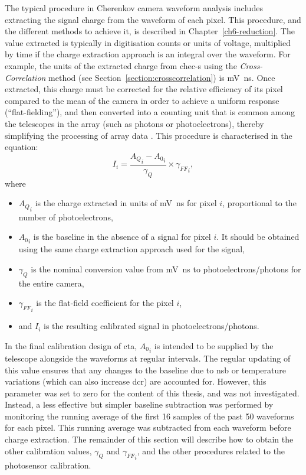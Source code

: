 The typical procedure in Cherenkov camera waveform analysis includes extracting the signal charge from the waveform of each pixel. This procedure, and the different methods to achieve it, is described in Chapter~\ref{ch6-reduction}. The value extracted is typically in digitisation counts or units of voltage, multiplied by time if the charge extraction approach is an integral over the waveform. For example, the units of the extracted charge from \gls{chec-s} using the \textit{Cross-Correlation} method (see Section~\ref{section:crosscorrelation}) is \si{mV ns}. Once extracted, this charge must be corrected for the relative efficiency of its pixel compared to the mean of the camera in order to achieve a uniform response (``flat-fielding''), and then converted into a counting unit that is common among the telescopes in the array (such as photons or photoelectrons), thereby simplifying the processing of array data \cite{Aharonian2004}. This procedure is characterised in the equation: 
\begin{equation} \label{eq:photosensor_calibration}
I_i = \frac{{A_Q}_i - {A_0}_i}{\gamma_{Q}} \times {\gamma_{FF}}_i,
\end{equation}
where 
\begin{itemize}
\item ${A_Q}_i$ is the charge extracted in units of \si{mV ns} for pixel $i$, proportional to the number of photoelectrons,
\item ${A_0}_i$ is the baseline in the absence of a signal for pixel $i$. It should be obtained using the same charge extraction approach used for the signal,
\item $\gamma_{Q}$ is the nominal conversion value from \si{mV ns} to photoelectrons/photons for the entire camera,
\item ${\gamma_{FF}}_i$ is the flat-field coefficient for the pixel $i$,
\item and $I_i$ is the resulting calibrated signal in photoelectrons/photons.
\end{itemize}

In the final calibration design of \gls{cta}, ${A_0}_i$ is intended to be supplied by the telescope alongside the waveforms at regular intervals. The regular updating of this value ensures that any changes to the baseline due to \gls{nsb} or temperature variations (which can also increase \gls{dcr}) are accounted for. However, this parameter was set to zero for the content of this thesis, and was not investigated. Instead, a less effective but simpler baseline subtraction was performed by monitoring the running average of the first 16 samples of the past 50 waveforms for each pixel. This running average was subtracted from each waveform before charge extraction. The remainder of this section will describe how to obtain the other calibration values, $\gamma_{Q}$ and ${\gamma_{FF}}_i$, and the other procedures related to the photosensor calibration.

